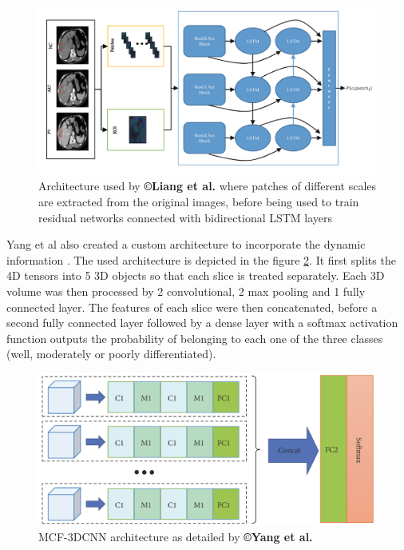 \begin{figure}[th!]
\centering
\includegraphics[width=0.7\linewidth]{images/image7_crop}
\caption{Architecture used by \textbf{©Liang et al.} where patches of different scales are extracted from the original images, before being used to train residual networks connected with bidirectional LSTM layers \cite{Liang2018}}
\label{Liang2018_Fig1}
\end{figure}

Yang et al also created a custom architecture to incorporate the dynamic information \cite{Yang2019}.
The used architecture is depicted in the figure \ref{fig:Yang2019_Figure2_MCF-3DCNN}. It first splits the 4D
tensors into 5 3D objects so that each slice is treated separately. Each
3D volume was then processed by 2 convolutional, 2 max pooling and 1
fully connected layer. The features of each slice were then
concatenated, before a second fully connected layer followed by a dense
layer with a softmax activation function outputs the probability of
belonging to each one of the three classes (well, moderately or poorly differentiated).

\begin{figure}[th!]
	\centering
	\includegraphics[width=0.7\linewidth]{../HistologicalGradePrediction/images/Yang2019_Fig2}
	\caption{MCF-3DCNN architecture as detailed by \textbf{©Yang et al. \cite{Yang2019}}}
	\label{fig:Yang2019_Figure2_MCF-3DCNN}
\end{figure}


